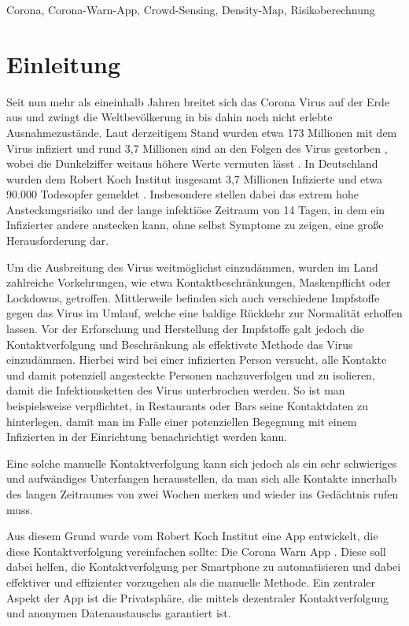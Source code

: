 \documentclass[conference,compsoc]{IEEEtran}
\begin{document}
\begin{IEEEkeywords}
Corona, Corona-Warn-App, Crowd-Sensing, Density-Map, Risikoberechnung
\end{IEEEkeywords}

\section{Einleitung} \label{Einleitung}
Seit nun mehr als eineinhalb Jahren breitet sich das Corona Virus auf der Erde aus und zwingt die Weltbevölkerung in bis dahin noch nicht erlebte Ausnahmezustände.
Laut derzeitigem Stand wurden etwa 173 Millionen mit dem Virus infiziert und rund 3,7 Millionen sind an den Folgen des Virus gestorben \cite{CoronaZahlenWorld}, wobei die Dunkelziffer weitaus höhere Werte vermuten lässt \cite{Dunkelziffer}. 
In Deutschland wurden dem Robert Koch Institut insgesamt 3,7 Millionen Infizierte und etwa 90.000 Todesopfer gemeldet \cite{CoronaZahlenDe}. 
Insbesondere stellen dabei das extrem hohe Ansteckungsrisiko und der lange infektiöse Zeitraum von 14 Tagen, in dem ein Infizierter andere anstecken kann, ohne selbst Symptome zu zeigen, eine große Herausforderung dar.

Um die Ausbreitung des Virus weitmöglichst einzudämmen, wurden im Land zahlreiche Vorkehrungen, wie etwa Kontaktbeschränkungen, Maskenpflicht oder Lockdowns, getroffen. 
Mittlerweile befinden sich auch verschiedene Impfstoffe gegen das Virus im Umlauf, welche eine baldige Rückkehr zur Normalität erhoffen lassen.
Vor der Erforschung und Herstellung der Impfstoffe galt jedoch die Kontaktverfolgung und Beschränkung als effektivste Methode das Virus einzudämmen. 
Hierbei wird bei einer infizierten Person versucht, alle Kontakte und damit potenziell angesteckte Personen nachzuverfolgen und zu isolieren, damit die Infektionsketten des Virus unterbrochen werden.
So ist man beispielsweise verpflichtet, in Restaurants oder Bars seine Kontaktdaten zu hinterlegen, damit man im Falle einer potenziellen Begegnung mit einem Infizierten in der Einrichtung benachrichtigt werden kann.

Eine solche manuelle Kontaktverfolgung kann sich jedoch als ein sehr schwieriges und aufwändiges Unterfangen herausstellen, 
da man sich alle Kontakte innerhalb des langen Zeitraumes von zwei Wochen merken und wieder ins Gedächtnis rufen muss.

Aus diesem Grund wurde vom Robert Koch Institut eine App entwickelt, die diese Kontaktverfolgung vereinfachen sollte: Die Corona Warn App \cite{CWA}. 
Diese soll dabei helfen, die Kontaktverfolgung per Smartphone zu automatisieren und dabei effektiver und effizienter vorzugehen als die manuelle Methode.
Ein zentraler Aspekt der App ist die Privatsphäre, die mittels dezentraler Kontaktverfolgung und anonymen Datenaustauschs garantiert ist.
\end{document}
